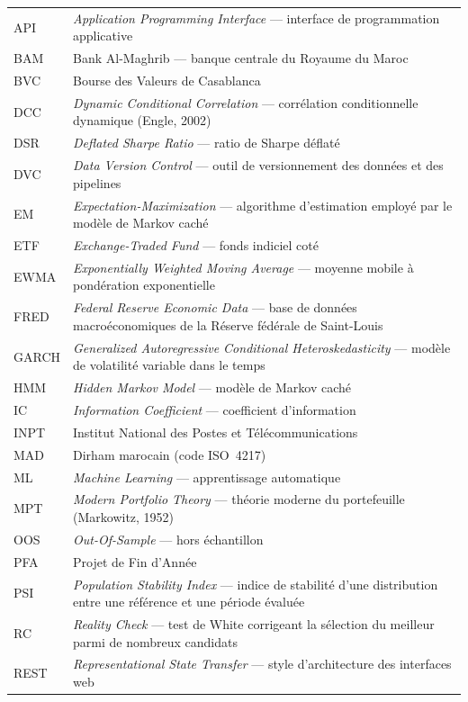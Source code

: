\begin{longtable}{@{}p{2.6cm}p{11.4cm}@{}}
API & \emph{Application Programming Interface} — interface de programmation
applicative \\
BAM & Bank Al-Maghrib — banque centrale du Royaume du Maroc \\
BVC & Bourse des Valeurs de Casablanca \\
DCC & \emph{Dynamic Conditional Correlation} — corrélation conditionnelle
dynamique (Engle, 2002) \\
DSR & \emph{Deflated Sharpe Ratio} — ratio de Sharpe déflaté \\
DVC & \emph{Data Version Control} — outil de versionnement des données et des
pipelines \\
EM & \emph{Expectation-Maximization} — algorithme d'estimation employé par le
modèle de Markov caché \\
ETF & \emph{Exchange-Traded Fund} — fonds indiciel coté \\
EWMA & \emph{Exponentially Weighted Moving Average} — moyenne mobile à
pondération exponentielle \\
FRED & \emph{Federal Reserve Economic Data} — base de données macroéconomiques
de la Réserve fédérale de Saint-Louis \\
GARCH & \emph{Generalized Autoregressive Conditional Heteroskedasticity} —
modèle de volatilité variable dans le temps \\
HMM & \emph{Hidden Markov Model} — modèle de Markov caché \\
IC & \emph{Information Coefficient} — coefficient d'information \\
INPT & Institut National des Postes et Télécommunications \\
MAD & Dirham marocain (code ISO~4217) \\
ML & \emph{Machine Learning} — apprentissage automatique \\
MPT & \emph{Modern Portfolio Theory} — théorie moderne du portefeuille
(Markowitz, 1952) \\
OOS & \emph{Out-Of-Sample} — hors échantillon \\
PFA & Projet de Fin d'Année \\
PSI & \emph{Population Stability Index} — indice de stabilité d'une
distribution entre une référence et une période évaluée \\
RC & \emph{Reality Check} — test de White corrigeant la sélection du meilleur
parmi de nombreux candidats \\
REST & \emph{Representational State Transfer} — style d'architecture des
interfaces web \\

\end{longtable}
